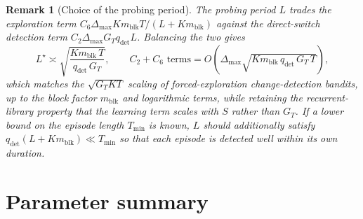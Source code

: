 \documentclass[11pt]{article}
\newtheorem{remark}{Remark}
\begin{document}
\begin{remark}[Choice of the probing period]
\label{rem:probing_period}
The probing period $L$ trades the exploration term $C_6\Delta_{\max}Km_{\mathrm{blk}}T/(L+Km_{\mathrm{blk}})$ against the direct-switch detection term $C_2\Delta_{\max}G_Tq_{\mathrm{det}}L$. Balancing the two gives
\begin{equation}
\label{eq:optimal_L}
L^\star
\asymp
\sqrt{\frac{Km_{\mathrm{blk}}\,T}{q_{\mathrm{det}}\,G_T}},
\qquad
C_2+C_6 \text{ terms}
=
O\!\left(\Delta_{\max}\sqrt{Km_{\mathrm{blk}}\,q_{\mathrm{det}}\,G_T\,T}\right),
\end{equation}
which matches the $\sqrt{G_TKT}$ scaling of forced-exploration change-detection bandits, up to the block factor $m_{\mathrm{blk}}$ and logarithmic terms, while retaining the recurrent-library property that the learning term scales with $S$ rather than $G_T$. If a lower bound on the episode length $T_{\mathrm{min}}$ is known, $L$ should additionally satisfy $q_{\mathrm{det}}(L+Km_{\mathrm{blk}})\ll T_{\mathrm{min}}$ so that each episode is detected well within its own duration.
\end{remark}

\section{Parameter summary}
\label{sec:parameters}
\end{document}
